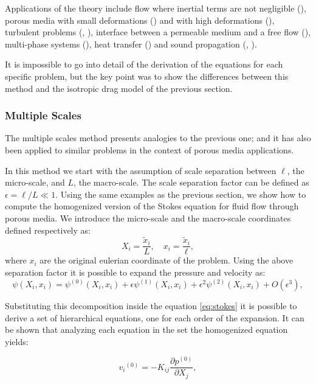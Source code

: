 Applications of the theory include flow where inertial terms are not negligible (\citet{whitaker1996forchheimer}), porous media with small deformations (\citet{whitaker1986flow2}) and with high deformations (\citet{hussong2011continuum}), turbulent problems (\citet{soulaine2014}, \citet{breugem2006influence}), interface between a permeable medium and a free flow (\citet{beavers1967boundary}), multi-phase systems (\citet{whitaker1973transport}), heat transfer (\citet{carbonell1984heat}) and sound propagation (\citet{firdaouss1998some}, \citet{lafarge1998sound}).

It is impossible to go into detail of the derivation of the equations for each specific problem, but the key point was to show the differences between this method and the isotropic drag model of the previous section.

\subsubsection{Multiple Scales}

The multiple scales method presents analogies to the previous one; and it has also been applied to similar problems in the context of porous media applications.

In this method we start with the assumption of scale separation between $\ell$, the micro-scale, and $L$, the macro-scale.
The scale separation factor can be defined as $\epsilon = \ell/L \ll 1$.
Using the same examples as the previous section, we show how to compute the homogenized version of the Stokes equation for fluid flow through porous media.
We introduce the micro-scale and the macro-scale coordinates defined respectively as:
$$
 X_i = \dfrac{\tilde{x}_i}{L}, \quad   x_i = \dfrac{\tilde{x}_i}{\ell},
$$
where $x_i$ are the original eulerian coordinate of the problem.
Using the above separation factor it is possible to expand the pressure and velocity as:
$$
\psi(X_i, x_i) = \psi^{(0)}(X_i, x_i)  +\epsilon \psi^{(1)}(X_i, x_i) +\epsilon^2 \psi^{(2)}(X_i, x_i) +O(\epsilon^3),
$$

Substituting this decomposition inside the equation \eqref{eq:stokes} it is possible to derive a set of hierarchical equations, one for each order of the expansion.
It can be shown that analyzing each equation in the set the homogenized equation yields:

\begin{equation}
{v_i}^{(0)} = -K_{ij} \dfrac{\partial p^{(0)}}{\partial X_j},
\label{eq:darcy_ms}
\end{equation} 

